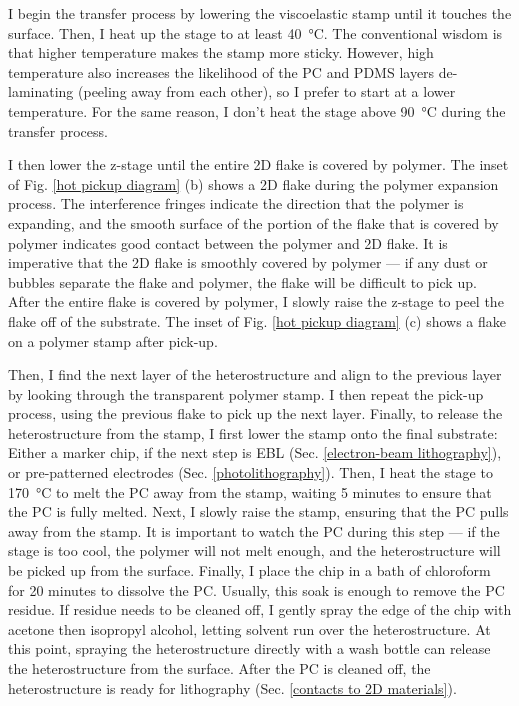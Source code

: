 \documentclass[double,12pt,1in]{beavtex}
\begin{document}
I begin the transfer process by lowering the viscoelastic stamp until it touches the surface. Then, I heat up the stage to at least \SI{40}{\celsius}. The conventional wisdom is that higher temperature makes the stamp more sticky. However, high temperature also increases the likelihood of the PC and PDMS layers de-laminating (peeling away from each other), so I prefer to start at a lower temperature. For the same reason, I don't heat the stage above \SI{90}{\celsius} during the transfer process. 

I then lower the z-stage until the entire 2D flake is covered by polymer. The inset of Fig. \ref{hot pickup diagram} (b) shows a 2D flake during the polymer expansion process. The interference fringes indicate the direction that the polymer is expanding, and the smooth surface of the portion of the flake that is covered by polymer indicates good contact between the polymer and 2D flake. It is imperative that the 2D flake is smoothly covered by polymer — if any dust or bubbles separate the flake and polymer, the flake will be difficult to pick up. After the entire flake is covered by polymer, I slowly raise the z-stage to peel the flake off of the substrate. The inset of Fig. \ref{hot pickup diagram} (c) shows a flake on a polymer stamp after pick-up.

Then, I find the next layer of the heterostructure and align to the previous layer by looking through the transparent polymer stamp. I then repeat the pick-up process, using the previous flake to pick up the next layer. Finally, to release the heterostructure from the stamp, I first lower the stamp onto the final substrate: Either a marker chip, if the next step is EBL (Sec. \ref{electron-beam lithography}), or pre-patterned electrodes (Sec. \ref{photolithography}). Then, I heat the stage to \SI{170}{\celsius} to melt the PC away from the stamp, waiting 5 minutes to ensure that the PC is fully melted. Next, I slowly raise the stamp, ensuring that the PC pulls away from the stamp. It is important to watch the PC during this step — if the stage is too cool, the polymer will not melt enough, and the heterostructure will be picked up from the surface. Finally, I place the chip in a bath of chloroform for 20 minutes to dissolve the PC. Usually, this soak is enough to remove the PC residue. If residue needs to be cleaned off, I gently spray the edge of the chip with acetone then isopropyl alcohol, letting solvent run over the heterostructure. At this point, spraying the heterostructure directly with a wash bottle can release the heterostructure from the surface. After the PC is cleaned off, the heterostructure is ready for lithography (Sec. \ref{contacts to 2D materials}).
\end{document}
